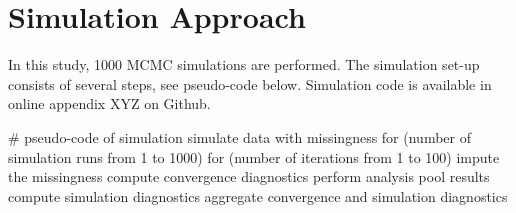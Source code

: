 \documentclass[article]{jss}
\begin{document}
% 
% 
% 
% 



\section{Simulation Approach}

In this study, 1000 MCMC simulations are performed. The simulation set-up consists of several steps, see pseudo-code below. Simulation code is available in online appendix XYZ on Github.

\begin{Code}
# pseudo-code of simulation 
simulate data with missingness
for (number of simulation runs from 1 to 1000)
  for (number of iterations from 1 to 100)
    impute the missingness
    compute convergence diagnostics
    perform analysis
    pool results
    compute simulation diagnostics
aggregate convergence and simulation diagnostics
\end{Code}
\end{document}
